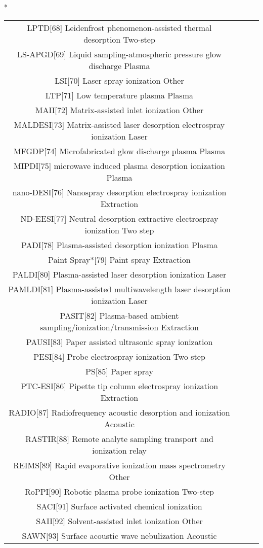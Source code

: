 \begin{table}{*}
\begin{tabular}{|c|c|c|l|}
LPTD[68] Leidenfrost phenomenon-assisted thermal desorption Two-step \\
LS-APGD[69] Liquid sampling-atmospheric pressure glow discharge Plasma \\
LSI[70] Laser spray ionization Other \\
LTP[71] Low temperature plasma Plasma \\
MAII[72] Matrix-assisted inlet ionization Other \\
MALDESI[73] Matrix-assisted laser desorption electrospray ionization Laser \\
MFGDP[74] Microfabricated glow discharge plasma Plasma \\
MIPDI[75] microwave induced plasma desorption ionization Plasma \\
nano-DESI[76] Nanospray desorption electrospray ionization Extraction \\
ND-EESI[77] Neutral desorption extractive electrospray ionization Two step \\
PADI[78] Plasma-assisted desorption ionization Plasma \\
Paint Spray*[79] Paint spray Extraction \\
PALDI[80] Plasma-assisted laser desorption ionization Laser \\
PAMLDI[81] Plasma-assisted multiwavelength laser desorption ionization Laser \\
PASIT[82] Plasma-based ambient sampling/ionization/transmission Extraction \\
PAUSI[83] Paper assisted ultrasonic spray ionization  \\
PESI[84] Probe electrospray ionization Two step \\
PS[85] Paper spray  \\
PTC-ESI[86] Pipette tip column electrospray ionization Extraction \\
RADIO[87] Radiofrequency acoustic desorption and ionization Acoustic \\
RASTIR[88] Remote analyte sampling transport and ionization relay \\ 
REIMS[89] Rapid evaporative ionization mass spectrometry Other \\
RoPPI[90] Robotic plasma probe ionization Two-step \\
SACI[91] Surface activated chemical ionization  \\
SAII[92] Solvent-assisted inlet ionization Other \\
SAWN[93] Surface acoustic wave nebulization Acoustic \\

\end{tabular}
\end{table}
